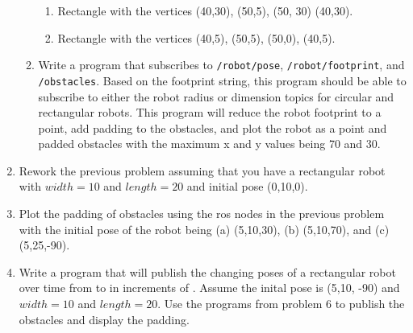 \begin{enumerate}
\begin{enumerate}
    \begin{enumerate}
    \tightlist
    \item
      Rectangle with the vertices (40,30), (50,5), (50, 30) (40,30).
    \item
      Rectangle with the vertices (40,5), (50,5), (50,0), (40,5).
    \end{enumerate}
  \item
    Write a program that subscribes to \texttt{/robot/pose},
    \texttt{/robot/footprint}, and \texttt{/obstacles}. Based on the
    footprint string, this program should be able to subscribe to either
    the robot radius or dimension topics for circular and rectangular
    robots. This program will reduce the robot footprint to a point, add
    padding to the obstacles, and plot the robot as a point and padded
    obstacles with the maximum x and y values being 70 and 30.
  \end{enumerate}
\item
  Rework the previous problem assuming that you have a rectangular robot
  with \(width=10\) and \(length=20\) and initial pose (0,10,0).
\item
  Plot the padding of obstacles using the ros nodes in the previous
  problem with the initial pose of the robot being (a) (5,10,30), (b)
  (5,10,70), and (c) (5,25,-90).
\item
  Write a program that will publish the changing poses of a rectangular
  robot over time from to in increments of . Assume the inital pose is
  (5,10, -90) and \(width=10\) and \(length=20\). Use the programs from
  problem 6 to publish the obstacles and display the padding.
\end{enumerate}
